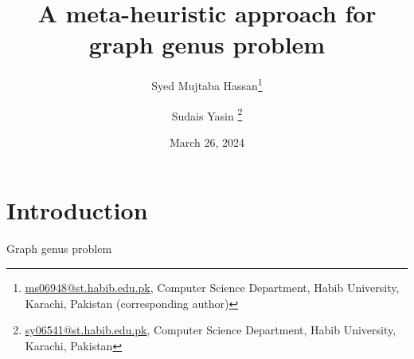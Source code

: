 \documentclass{article}
\newcommand{\Prob}[1]{\ensuremath{\text{\textsc{#1}}}}
\begin{document}
\title{A meta-heuristic approach for graph genus problem}
\author{Syed Mujtaba Hassan\footnote{\url{ms06948@st.habib.edu.pk}, Computer Science Department, Habib University, Karachi, Pakistan (corresponding author)} \and Sudais Yasin \footnote{\url{sy06541@st.habib.edu.pk}, Computer Science Department, Habib University, Karachi, Pakistan}}
\date{March 26, 2024}
\maketitle





\renewcommand\thefootnote{}


\renewcommand\thefootnote{\fnsymbol{footnote}}
\setcounter{footnote}{1}
\section{Introduction}
    Graph genus problem 
\end{document}
